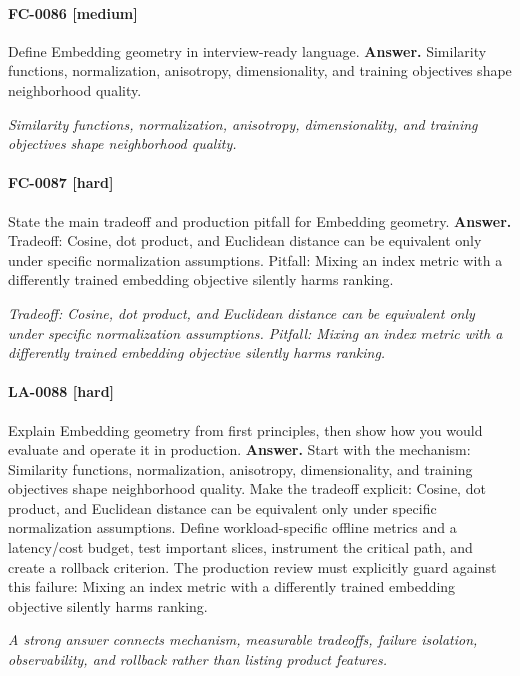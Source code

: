 \paragraph{FC-0086 [medium]} Define Embedding geometry in interview-ready language.
\noindent\textbf{Answer.} Similarity functions, normalization, anisotropy, dimensionality, and training objectives shape neighborhood quality.
\par\textit{Similarity functions, normalization, anisotropy, dimensionality, and training objectives shape neighborhood quality.}
\paragraph{FC-0087 [hard]} State the main tradeoff and production pitfall for Embedding geometry.
\noindent\textbf{Answer.} Tradeoff: Cosine, dot product, and Euclidean distance can be equivalent only under specific normalization assumptions. Pitfall: Mixing an index metric with a differently trained embedding objective silently harms ranking.
\par\textit{Tradeoff: Cosine, dot product, and Euclidean distance can be equivalent only under specific normalization assumptions. Pitfall: Mixing an index metric with a differently trained embedding objective silently harms ranking.}
\paragraph{LA-0088 [hard]} Explain Embedding geometry from first principles, then show how you would evaluate and operate it in production.
\noindent\textbf{Answer.} Start with the mechanism: Similarity functions, normalization, anisotropy, dimensionality, and training objectives shape neighborhood quality. Make the tradeoff explicit: Cosine, dot product, and Euclidean distance can be equivalent only under specific normalization assumptions. Define workload-specific offline metrics and a latency/cost budget, test important slices, instrument the critical path, and create a rollback criterion. The production review must explicitly guard against this failure: Mixing an index metric with a differently trained embedding objective silently harms ranking.
\par\textit{A strong answer connects mechanism, measurable tradeoffs, failure isolation, observability, and rollback rather than listing product features.}
